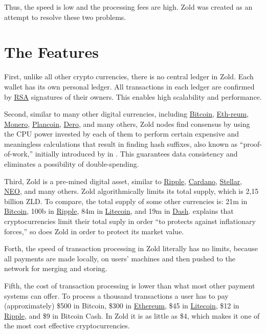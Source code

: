 \documentclass[12pt,oneside]{article}
\begin{document}
Thus, the speed is low and the processing fees are high.
Zold was created as an attempt to resolve these two problems.

\pagebreak

\section*{The Features}

First, unlike all other crypto currencies, there is no central ledger in Zold.
Each wallet has its own personal ledger.
All transactions in each ledger are confirmed by
\href{https://en.wikipedia.org/wiki/RSA_(cryptosystem)}{RSA} signatures of their owners.
This enables high scalability and performance.

Second, similar to many other digital currencies, including
\href{https://bitcoin.org/}{Bit\-coin},
\href{https://ethereum.org/}{Eth-reum},
\href{https://getmonero.org/}{Mone\-ro},
\href{https://plancoin.co/}{Plancoin},
\href{https://dero.io/}{Dero},
and many others, Zold nodes find consensus by using the CPU power invested
by each of them to perform certain expensive and meaningless calculations
that result in finding hash suffixes, also known as ``proof-of-work,''
initially introduced by  in \citeyear{back1997}.
This guarantees data consistency and eliminates a possibility of double-spending.

Third, Zold is a pre-mined digital asset, similar to
\href{https://ripple.com/}{Ripple},
\href{https://www.cardano.org/en/home/}{Cardano},
\href{https://www.stellar.org/}{Stellar},
\href{https://neo.org/}{NEO}, and many others.
Zold algorithmically limits its total supply, which is 2,15 billion ZLD.
To compare, the total supply of some other currencies is:
21m in \href{https://bitcoin.org/}{Bitcoin},
100b in \href{https://ripple.com/}{Ripple},
84m in \href{https://litecoin.org/}{Litecoin},
and
19m in \href{https://www.dash.org/}{Dash}.
 explains that cryptocurrencies limit their
total suply in order ``to protects against inflationary forces,''
so does Zold in order to protect its market value.

Forth, the speed of transaction processing in Zold
literally has no limits, because all payments are made locally, on users'
machines and then pushed to the network for merging and storing.

Fifth, the cost of transaction processing
is lower than what most other payment systems can offer. To process
a thousand transactions a user has to pay (approximately) \$500 in Bitcoin, \$300 in \href{https://ethereum.org/}{Ethereum},
\$45 in \href{https://litecoin.org/}{Litecoin}, \$12 in \href{https://ripple.com/}{Ripple}, and \$9 in Bitcoin Cash.
In Zold it is as little as \$4, which makes it one of the most cost effective
cryptocurrencies.
\end{document}
